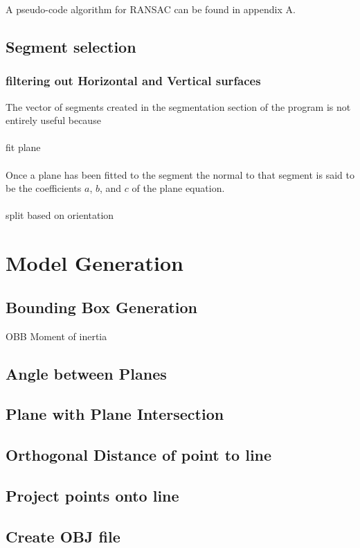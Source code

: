 			
			A pseudo-code algorithm for RANSAC can be found in appendix A.
		\subsection{Segment selection}

			
			\subsubsection{filtering out Horizontal and Vertical surfaces}
				The vector of segments created in the segmentation section of the program is not entirely useful because \\
				\\
				fit plane\\
			\\
				Once a plane has been fitted to the segment the normal to that segment is said to be the coefficients $a$, $b$, and $c$ of the plane equation.\\
				\\
				split based on orientation
			



\section{Model Generation}
		\subsection{Bounding Box Generation}
		OBB
		Moment of inertia
		
		\subsection{Angle between Planes}
		
		\subsection{Plane with Plane Intersection}
		
		\subsection{Orthogonal Distance of point to line}
		
		\subsection{Project points onto line}
		
		\subsection{Create OBJ file}

	


